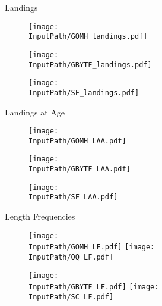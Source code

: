 \documentclass[]{report}
\begin{document}
\newcommand{\InputPath}{../example_figs} %
\newcommand{\scale}{0.5}
\newcommand{\pages}{1}
\newcommand{\width}{1.0\textwidth}
\newcommand{\Mwidth}{0.65\textwidth}



%
\Huge{Landings}
\begin{figure}[!htb]
    \begin{minipage}{\Mwidth}
        \centering
        \texttt{[image: \\InputPath/GOMH\_landings.pdf]}
    \end{minipage}%
    \begin{minipage}{\Mwidth}
        \centering
        \texttt{[image: \\InputPath/GBYTF\_landings.pdf]}
    \end{minipage}
    \begin{minipage}{\Mwidth}
        \centering
        \texttt{[image: \\InputPath/SF\_landings.pdf]}
    \end{minipage}
\end{figure}
\clearpage

\renewcommand{\Mwidth}{0.6\textwidth}
\Huge{Landings at Age}
\begin{figure}[!htb]
    \begin{minipage}{\Mwidth}
        \centering
        \texttt{[image: \\InputPath/GOMH\_LAA.pdf]}
    \end{minipage}%
    \begin{minipage}{\Mwidth}
        \centering
        \texttt{[image: \\InputPath/GBYTF\_LAA.pdf]}
    \end{minipage}
    \begin{minipage}{\Mwidth}
        \centering
        \texttt{[image: \\InputPath/SF\_LAA.pdf]}
    \end{minipage}
\end{figure}
\clearpage


\renewcommand{\Mwidth}{0.5\textwidth}
\Huge{Length Frequencies}
\begin{figure}[!htb]
    \begin{minipage}{\Mwidth}
        \centering
        \texttt{[image: \\InputPath/GOMH\_LF.pdf]}
    	\texttt{[image: \\InputPath/OQ\_LF.pdf]}
    \end{minipage}%
    \begin{minipage}{\Mwidth}
        \centering
        \texttt{[image: \\InputPath/GBYTF\_LF.pdf]}
    	\texttt{[image: \\InputPath/SC\_LF.pdf]}
    \end{minipage}    
\end{figure}
\clearpage
\end{document}
